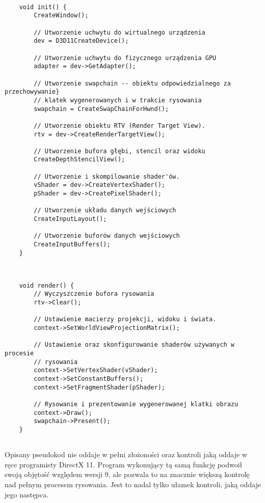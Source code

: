 \begin{lstlisting}[caption={Pseudokod inicjalizacji Direct3D 11 (oryginalna treść)}, label={lst:d3d11:init}]
	
	void init() {
		CreateWindow();
		
		// Utworzenie uchwytu do wirtualnego urządzenia
		dev = D3D11CreateDevice();
		
		// Utworzenie uchwytu do fizycznego urządzenia GPU
		adapter = dev->GetAdapter();
		
		// Utworzenie swapchain -- obiektu odpowiedzialnego za przechowywanie}
		// klatek wygenerowanych i w trakcie rysowania
		swapchain = CreateSwapChainForHwnd();
		
		// Utworzenie obiektu RTV (Render Target View).
		rtv = dev->CreateRenderTargetView();
		
		// Utworzenie bufora głębi, stencil oraz widoku
		CreateDepthStencilView();
		
		// Utworzenie i skompilowanie shader'ów.
		vShader = dev->CreateVertexShader();
		pShader = dev->CreatePixelShader();
		
		// Utworzenie układu danych wejściowych
		CreateInputLayout();
		
		// Utworzenie buforów danych wejściowych
		CreateInputBuffers();
	}
	
\end{lstlisting}

\begin{lstlisting}[caption={Pseudokod rysowania Direct3D 11 (oryginalna treść)}, label={lst:d3d11:render}]
	
	void render() {
		// Wyczyszczenie bufora rysowania
		rtv->Clear();
		
		// Ustawienie macierzy projekcji, widoku i świata.
		context->SetWorldViewProjectionMatrix();
		
		// Ustawienie oraz skonfigurowanie shaderów używanych w procesie
		// rysowania
		context->SetVertexShader(vShader);	
		context->SetConstantBuffers();
		context->SetFragmentShader(pShader);
		
		// Rysowanie i prezentowanie wygenerowanej klatki obrazu
		context->Draw();
		swapchain->Present();
	}
	
\end{lstlisting}

Opisany pseudokod nie oddaje w pełni złożoności oraz kontroli jaką
oddaje w ręce programisty DirectX 11. Program wykonujący tą samą funkcję
podwoił swoją objętość względem wersji 9, ale pozwala to na znacznie
większą kontrolę nad pełnym procesem rysowania. Jest to nadal tylko
ułamek kontroli, jaką oddaje jego następca.

